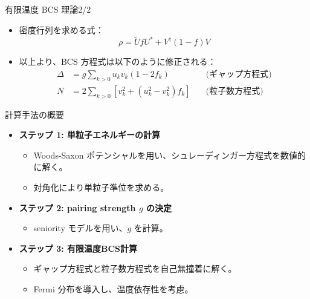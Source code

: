 \documentclass[aspectratio=169, 12pt, dvipdfmx]{beamer}
\begin{document}
\begin{frame}{有限温度 BCS 理論2/2}
  \begin{itemize}
    \item 密度行列を求める式：
    \[
    \rho = \tilde{U}fU^* +V^\dagger(1-f)V
    \]
    \item 以上より、BCS 方程式は以下のように修正される：
      \begin{align}
        \Delta  &=  g\sum_{k>0} u_k v_k (1 - 2 f_k) \quad &\text{(ギャップ方程式)} \label{Gap FT} \\
        N       &=  2\sum_{k>0} \left[ v_k^2 + (u_k^2 - v_k^2) f_k \right] \quad &\text{(粒子数方程式)} \label{number FT} 
      \end{align}
  \end{itemize}
\end{frame}


\begin{frame}{計算手法の概要}
  \begin{itemize}
    \item \textbf{ステップ 1: 単粒子エネルギーの計算}
      \begin{itemize}
        \item Woods-Saxon ポテンシャルを用い、シュレーディンガー方程式を数値的に解く。
        \item 対角化により単粒子準位を求める。
      \end{itemize}
    \item \textbf{ステップ 2: pairing strength $g$ の決定}
      \begin{itemize}
        \item seniority モデルを用い、$g$ を計算。
      \end{itemize}
    \item \textbf{ステップ 3: 有限温度BCS計算}
      \begin{itemize}
        \item ギャップ方程式と粒子数方程式を自己無撞着に解く。
        \item Fermi 分布を導入し、温度依存性を考慮。
      \end{itemize}
  \end{itemize}
\end{frame}
\end{document}
